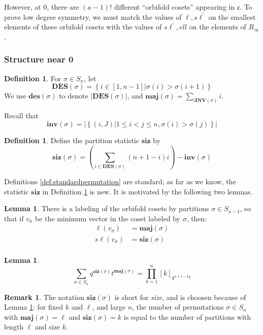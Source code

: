 \documentclass{amsart}[12pt]
\theoremstyle{definition}
\newtheorem{lemma}[dummy]{Lemma}
\newtheorem{definition}[dummy]{Definition}
\newtheorem{remark}[dummy]{Remark}
\newcommand{\sk}{s\ell}
\newcommand{\inv}{\mathbf{inv}}
\newcommand{\INV}{\mathbf{INV}}
\newcommand{\DES}{\mathbf{DES}}
\newcommand{\des}{\mathbf{des}}
\newcommand{\maj}{\mathbf{maj}}
\newcommand{\siz}{\mathbf{siz}}
\begin{document}
However, at 0, there are $(a-1)!$ different ``orbifold cosets'' appearing in $\mathfrak{c}$.  To prove low degree symmetry, we must match the values of $\ell, \sk^\prime$ on the smallest elements of these orbifold cosets with the values of $\sk^\prime, ell$ on the elements of $R_\infty$.


\subsubsection{Structure near 0}



\begin{definition} \label{def:standardpermutations}
For $\sigma\in S_n$, let 
$$\DES(\sigma)=\left\{i\in [1, n-1] \Big | \sigma(i)>\sigma(i+1)\right\}$$
We use $\des(\sigma)$ to denote $|\DES(\sigma)|$, and $\maj(\sigma)=\sum_{i\INV(\sigma)} i$.

Recall that 
$$\inv(\sigma)=\left|\left\{(i,J)\big| 1\leq i<j\leq n, \sigma(i)>\sigma(j)\right\}\right|$$
\end{definition}

\begin{definition} \label{def:sizepermutation}
Define the partition statistic $\siz$ by
$$\siz(\sigma)=\left(\sum_{i\in\DES(\sigma)} (n+1-i)i\right)-\inv(\sigma)$$
\end{definition}

Definitions \ref{def:standardpermutation} are standard; as far as we know, the statistic $\siz$ in Definition \ref{def:sizepermutation} is new.  It is motivated by the following two lemmas.

\begin{lemma} \label{lem:sizmaj1}
There is a labeling of the orbifold cosets by partitions $\sigma\in S_{a-1}$, so that if $v_\sigma$ be the minimum vector in the coset labeled by $\sigma$, then:
\begin{align*}
\ell(v_\sigma)&=\maj(\sigma) \\
\sk(v_\sigma)&=\siz(\sigma)\\
\end{align*}

\end{lemma}

\begin{lemma} \label{lem:sizmaj2}
$$\sum_{\sigma\in S_n} q^{\siz(\sigma)} t^{\maj(\sigma)}=\prod_{k=1}^n [k]_{q^{n+1-k}t}$$
\end{lemma}


\begin{remark}
The notation $\siz(\sigma)$ is short for \emph{size}, and is choosen because of Lemma \ref{lem:sizmaj2}: for fixed $k$ and $\ell$, and large $n$, the number of permutations $\sigma\in S_n$ with $\maj(\sigma)=\ell$ and $\siz(\sigma)=k$ is equal to the number of partitions with length $\ell$ and size $k$.
\end{remark}
\end{document}

